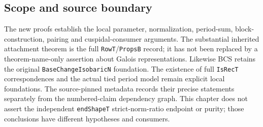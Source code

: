 \subsection{Scope and source boundary}

The new proofs establish the local parameter, normalization,
period-sum, block-construction, pairing and cuspidal-consumer
arguments.  The substantial inherited attachment theorem is
the full \texttt{RowT}/\texttt{PropsB} record; it has not
been replaced by a theorem-name-only assertion about Galois
representations.  Likewise BCS retains the original
\texttt{BaseChangeIsobaricN} foundation.  The existence of
full \texttt{IsRecT} correspondences and the actual tied
period model remain explicit local foundations.  The
source-pinned metadata records their precise statements
separately from the numbered-claim dependency graph.
This chapter does not assert the independent
\texttt{endShapeT} strict-norm-ratio endpoint or purity;
those conclusions have different hypotheses and consumers.
